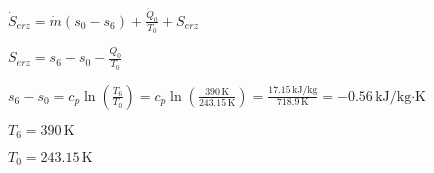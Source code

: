 \( \dot{S}_{erz} = \dot{m} (s_0 - s_6) + \frac{\dot{Q}_0}{T_0} + S_{erz} \)  

\( S_{erz} = s_6 - s_0 - \frac{Q_0}{T_0} \)  

\( s_6 - s_0 = c_p \ln \left( \frac{T_6}{T_0} \right) = c_p \ln \left( \frac{390 \, \text{K}}{243.15 \, \text{K}} \right) = \frac{17.15 \, \text{kJ/kg}}{718.9 \, \text{K}} = -0.56 \, \text{kJ/kg·K} \)  

\( T_6 = 390 \, \text{K} \)  

\( T_0 = 243.15 \, \text{K} \)